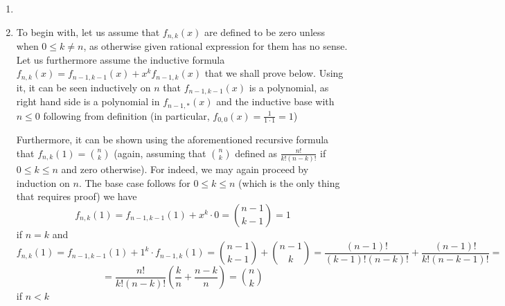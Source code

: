 \documentclass[8pt]{article} %
\begin{document}
\begin{enumerate}[label=\bfseries Problem \arabic*.]
{\begin{enumerate}[label=(\arabic*).]
{				We claim that the set of {\it upper triangular matrices with all diagonal elements equal to 1} will do. They do form a subgroup, as
				they are a subset of $\M$ (in fact, each of them has determinant equal to 1)
				closed under multiplication, identity belongs to this set as well as inverse of any element (this is true, as
				can be seen most easily by computing inverse via the matrix of cofactors). And the order of this subgroup is precisely
				$q^{\frac{n(n-1)}{2}})$, as we have zeros below the diagonal, ones on diagonal and places above the diagonal can be filled with
				anything -- and we have $\frac{n(n-1)}{2}$ of such places.
				}
			\item{
				}
			\item{To begin with, let us assume that $f_{n,k}(x)$ are defined to be zero unless when $0\leq k\neq n$, as otherwise
				given rational expression for them has no sense. Let us furthermore assume the inductive formula
				$f_{n,k}(x)=f_{n-1,k-1}(x)+x^kf_{n-1,k}(x)$ that we shall prove below. Using it, it can be seen
				inductively on $n$ that $f_{n-1,k-1}(x)$ is a polynomial, as right hand side is a polynomial in $f_{n-1,\ast}(x)$ and the inductive
				base with $n\leq 0$ following from definition (in particular, $f_{0,0}(x)=\frac{1}{1\cdot 1}=1$)
				
				Furthermore, it can be shown using the aforementioned recursive formula that $f_{n,k}(1)=\binom{n}{k}$ (again, assuming that
				$\binom{n}{k}$ defined as $\frac{n!}{k!(n-k)!}$ if $0\leq k\leq n$ and zero otherwise). For indeed, we may again proceed by induction
				on $n$. The base case follows for $0\leq k\leq n$ (which is the only thing that requires proof) we have 
				\[f_{n,k}(1)=f_{n-1,k-1}(1)+x^k\cdot 0=\binom{n-1}{k-1}=1\]
				if $n=k$ and
				\[f_{n,k}(1)=f_{n-1,k-1}(1)+1^k\cdot f_{n-1,k}(1)=\binom{n-1}{k-1}+\binom{n-1}{k}=\frac{(n-1)!}{(k-1)!(n-k)!}+\frac{(n-1)!}{k!(n-k-1)!}
				=\]\[=\frac{n!}{k!(n-k)!}\left(\frac{k}{n}+\frac{n-k}{n}\right)=\binom{n}{k}\]
				if $n<k$

}
\end{enumerate}}
\end{enumerate}
\end{document}
